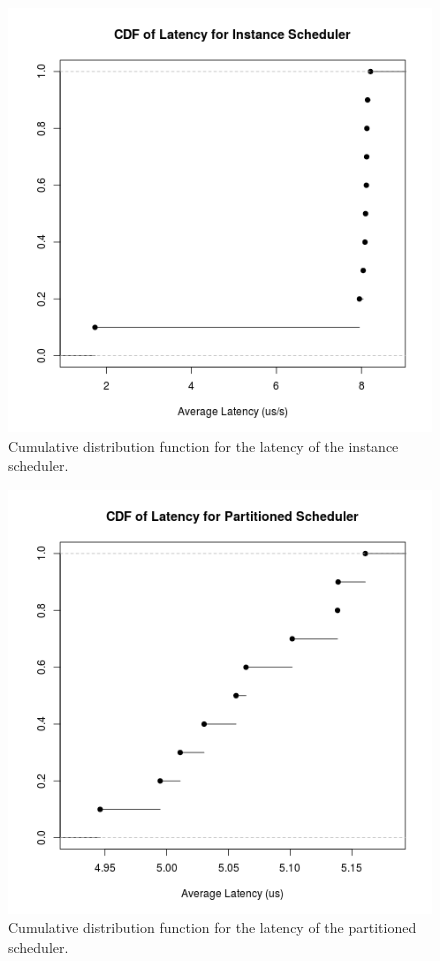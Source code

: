 \begin{figure}
\center
\includegraphics[width=\textwidth]{instance_latency_cdf.png}
\caption{Cumulative distribution function for the latency of the instance scheduler. \label{instance_latency}}
\end{figure}

\begin{figure}
\center
\includegraphics[width=\textwidth]{partitioned_latency_cdf.png}
\caption{Cumulative distribution function for the latency of the partitioned scheduler. \label{partitioned_latency}}
\end{figure}

